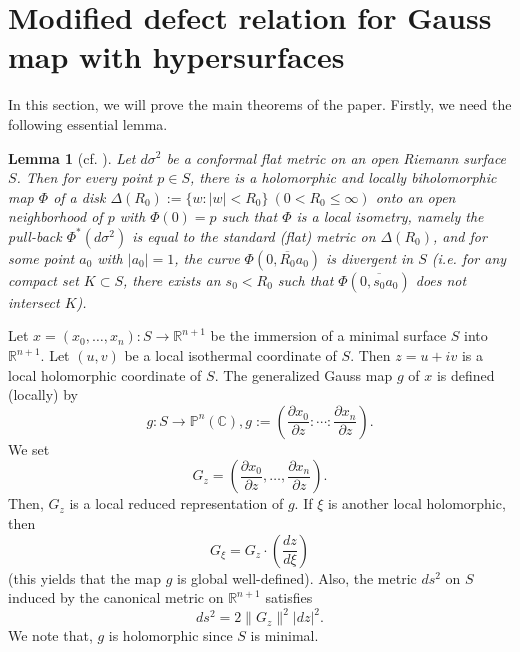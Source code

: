 \documentclass[12pt,article]{amsart}
\newtheorem{lemma}[equation]{Lemma}
\newcommand{\C}{{\mathbb{C}}}
\renewcommand{\P}{{\mathbb{P}}}
\newcommand{\R}{{\mathbb{R}}}
\numberwithin{equation}{section}
\begin{document}
\section{Modified defect relation for Gauss map with hypersurfaces}

In this section, we will prove the main theorems of the paper. Firstly, we need the following essential lemma.

\begin{lemma}[{cf. \cite[Lemma 1.6.7]{Fu93}}]\label{lem4.1}
Let $d\sigma^2$ be a conformal flat metric on an open Riemann surface $S$. Then for every point $p\in S$, there is a holomorphic and locally biholomorphic map $\Phi$ of a disk $\Delta (R_0):=\{w:|w| <R_0\}\ (0 <R_0\le\infty)$ onto an open neighborhood of $p$ with $\Phi(0)=p$ such that $\Phi$ is a local isometry, namely the pull-back $\Phi^*(d\sigma^2)$ is equal to the standard (flat) metric on $\Delta(R_0)$, and for some point $a_0$ with $|a_0|=1$, the curve $\Phi (\overline{0,R_0a_0})$ is divergent in $S$ (i.e. for any compact set $K\subset S$, there exists an $s_0<R_0$ such that $\Phi (\overline{0,s_0a_0})$ does not intersect $K$).
\end{lemma}

Let $x=(x_0,\ldots,x_{n}): S\rightarrow\R^{n+1}$ be the immersion of a minimal surface $S$ into $\R^{n+1}$. Let $(u,v)$ be a local isothermal coordinate of $S$. Then $z=u+iv$ is a local holomorphic coordinate of $S$. The generalized Gauss map $g$ of $x$ is defined (locally) by
$$ g:S\rightarrow\P^{n}(\C), g:=\left(\dfrac{\partial x_0}{\partial z}:\cdots:\dfrac{\partial x_{n}}{\partial z}\right).$$
We set 
$$G_z=\left(\dfrac{\partial x_0}{\partial z},\ldots,\dfrac{\partial x_{n}}{\partial z}\right).$$
Then, $G_z$ is a local reduced representation of $g$. If $\xi$ is another local holomorphic, then 
$$G_\xi=G_z\cdot\left (\dfrac{dz}{d\xi}\right)$$
(this yields that the map $g$ is global well-defined). Also, the metric $ds^2$ on $S$ induced by the canonical metric on $\R^{n+1}$ satisfies
$$ ds^2=2\|G_z\|^2|dz|^2.$$
We note that, $g$ is holomorphic since $S$ is minimal.
\end{document}
